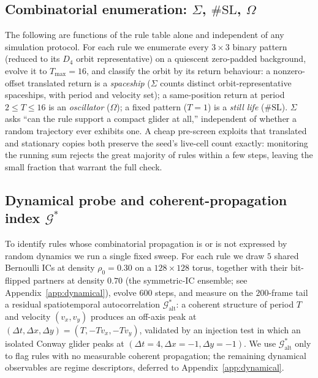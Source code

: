 \documentclass{article}
\begin{document}
\subsection{Combinatorial enumeration: $\Sigma$, $\#\mathrm{SL}$, $\Omega$}
\label{sec:enum}

The following are functions of the rule table alone and independent of any
simulation protocol. For each rule we enumerate every $3{\times}3$ binary pattern
(reduced to its $D_4$ orbit representative) on a quiescent zero-padded background,
evolve it to $T_{\max}=16$, and classify the orbit by its return behaviour: a
nonzero-offset translated return is a \emph{spaceship} ($\Sigma$ counts distinct
orbit-representative spaceships, with period and velocity set); a same-position
return at period $2\le T\le16$ is an \emph{oscillator} ($\Omega$); a fixed pattern
($T{=}1$) is a \emph{still life} ($\#\mathrm{SL}$). $\Sigma$ asks ``can the rule
support a compact glider at all,'' independent of whether a random trajectory ever
exhibits one. A cheap pre-screen exploits that translated and stationary copies
both preserve the seed's live-cell count exactly: monitoring the running sum
rejects the great majority of rules within a few steps, leaving the small
fraction that warrant the full check.

\subsection{Dynamical probe and coherent-propagation index $\mathcal{G}^{*}$}
\label{sec:dyn}

To identify rules whose combinatorial propagation is or is not expressed by random
dynamics we run a single fixed sweep. For each rule we draw $5$ shared Bernoulli
ICs at density $\rho_0=0.30$ on a $128\times128$ torus, together with their
bit-flipped partners at density $0.70$ (the symmetric-IC ensemble; see
Appendix~\ref{app:dynamical}), evolve $600$ steps, and measure on the $200$-frame
tail a residual spatiotemporal autocorrelation $\mathcal{G}^{*}_{\text{alt}}$: a
coherent structure of period $T$ and velocity $(v_x,v_y)$ produces an off-axis
peak at $(\Delta t,\Delta x,\Delta y)=(T,-Tv_x,-Tv_y)$, validated by an injection
test in which an isolated Conway glider peaks at $(\Delta t{=}4,\Delta
x{=}{-}1,\Delta y{=}{-}1)$. We use $\mathcal{G}^{*}_{\text{alt}}$ only to flag
rules with no measurable coherent propagation; the remaining dynamical observables
are regime descriptors, deferred to Appendix~\ref{app:dynamical}.
\end{document}
